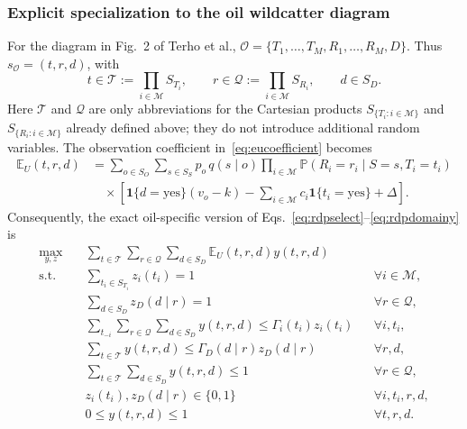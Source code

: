 \documentclass[11pt,a4paper]{article}
\newcommand{\Prob}{\mathbb{P}}
\newcommand{\calM}{\mathcal{M}}
\newcommand{\one}{\mathbf{1}}
\begin{document}
\subsubsection{Explicit specialization to the oil wildcatter diagram}
For the diagram in Fig.~2 of Terho et al.,
$\mathcal O=\{T_1,\ldots,T_M,R_1,\ldots,R_M,D\}$.  Thus
$s_{\mathcal O}=(t,r,d)$, with
\begin{equation}\label{eq:oilsegments}
 t\in\mathcal T:=\prod_{i\in\calM}S_{T_i},\qquad
 r\in\mathcal Q:=\prod_{i\in\calM}S_{R_i},\qquad
 d\in S_D.
\end{equation}
Here $\mathcal T$ and $\mathcal Q$ are only abbreviations for the
Cartesian products $S_{\{T_i:i\in\calM\}}$ and
$S_{\{R_i:i\in\calM\}}$ already defined above; they do not introduce additional random variables.  The
observation coefficient in~\eqref{eq:eucoefficient} becomes
\begin{equation}\label{eq:oilEU}
\begin{aligned}
 \mathbb E_U(t,r,d)
 &=\sum_{o\in S_O}\sum_{s\in S_S}
   p_o\,q(s\mid o)
   \prod_{i\in\calM}
     \Prob(R_i=r_i\mid S=s,T_i=t_i)\\[-1pt]
 &\quad\times\left[
   \one\{d=\mathrm{yes}\}(v_o-k)
   -\sum_{i\in\calM}c_i\one\{t_i=\mathrm{yes}\}
   +\Delta\right].
\end{aligned}
\end{equation}
Consequently, the exact oil-specific version of
Eqs.~\eqref{eq:rdpselect}--\eqref{eq:rdpdomainy} is
\begin{subequations}\label{eq:oilrdp}
\begin{align}
 \max_{y,z}\quad
 &\sum_{t\in\mathcal T}\sum_{r\in\mathcal Q}
     \sum_{d\in S_D}\mathbb E_U(t,r,d)y(t,r,d)
          \label{eq:oilrdpobj}\\
 \text{s.t.}\quad
 &\sum_{t_i\in S_{T_i}}z_i(t_i)=1
    &&\forall i\in\calM,\label{eq:oilseltest}\\
 &\sum_{d\in S_D}z_D(d\mid r)=1
    &&\forall r\in\mathcal Q,\label{eq:oilseldrill}\\
 &\sum_{t_{-i}}\sum_{r\in\mathcal Q}\sum_{d\in S_D}
       y(t,r,d)\le\Gamma_i(t_i)z_i(t_i)
    &&\forall i,t_i,\label{eq:oillinktest}\\
 &\sum_{t\in\mathcal T}y(t,r,d)
    \le\Gamma_D(d\mid r)z_D(d\mid r)
    &&\forall r,d,\label{eq:oillinkdrill}\\
 &\sum_{t\in\mathcal T}\sum_{d\in S_D}y(t,r,d)\le1
    &&\forall r\in\mathcal Q,\label{eq:oilobs}\\
 &z_i(t_i),z_D(d\mid r)\in\{0,1\}
    &&\forall i,t_i,r,d,\label{eq:oildomainz}\\
 &0\le y(t,r,d)\le1
    &&\forall t,r,d.\label{eq:oildomainy}
\end{align}
\end{subequations}
\end{document}
